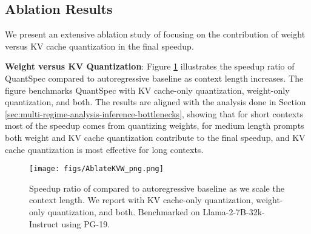 \subsection{Ablation Results}
We present an extensive ablation study of \OURS{} focusing on the contribution of weight versus KV cache quantization in the final speedup.

\textbf{Weight versus KV Quantization}: Figure \ref{fig:ablation} illustrates the speedup ratio of QuantSpec compared to autoregressive baseline as context length increases. The figure benchmarks QuantSpec with KV cache-only quantization, weight-only quantization, and both. The results are aligned with the analysis done in Section \ref{sec:multi-regime-analysis-inference-bottlenecks}, showing that for short contexts most of the speedup comes from quantizing weights, for medium length prompts both weight and KV cache quantization contribute to the final speedup, and KV cache quantization is most effective for long contexts.


\begin{figure}[h]
    \centering
    \texttt{[image: figs/AblateKVW\_png.png]}
    \vspace{-7mm}
    \caption{Speedup ratio of \OURS{} compared to autoregressive baseline as we scale the context length. We report \OURS{} with KV cache-only quantization, weight-only quantization, and both. Benchmarked on Llama-2-7B-32k-Instruct using PG-19.}
    \label{fig:ablation}
\end{figure}
